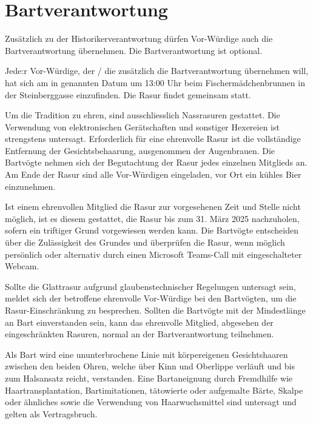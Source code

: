 \documentclass[fontsize=12pt,parskip=half]{scrartcl}
\begin{document}
\section{Bartverantwortung}
\begin{contract}
  \Clause[title={Bartverantwortung}]\label{B.verantwortung}
  Zusätzlich zu der Historikerverantwortung  dürfen Vor-Würdige auch die Bartverantwortung übernehmen. Die Bartverantwortung ist
  optional.

  \Clause[title={Letzte Rasur}]\label{B.lastrasur}
  Jede:r Vor-Würdige, der / die zusätzlich die Bartverantwortung übernehmen will, hat sich am in  genannten Datum um 13:00 Uhr
  beim Fischermädchenbrunnen in der Steinberggasse einzufinden.
  Die Rasur findet gemeinsam statt.

  \SubClause[title={Durchführung der Rasur}]\label{B.durchfuehrung}
  Um die Tradition zu ehren, sind ausschliesslich Nassrasuren gestattet. Die Verwendung von
  elektronischen Gerätschaften und sonstiger Hexereien ist strengstens untersagt. Erforderlich für eine
  ehrenvolle Rasur ist die vollständige Entfernung der Gesichtsbehaarung, ausgenommen der
  Augenbrauen. Die Bartvögte nehmen sich der Begutachtung der Rasur jedes einzelnen Mitglieds
  an.
  \SubClause[title={Anschliessende Kehlenbefeuchtung}]
  Am Ende der Rasur sind alle Vor-Würdigen eingeladen, vor Ort ein kühles Bier einzunehmen.

  \SubClause[title={Rasurverzug}]
  Ist einem ehrenvollen Mitglied die Rasur zur vorgesehenen Zeit und Stelle nicht möglich,
  ist es diesem gestattet, die Rasur bis zum 31. März 2025 nachzuholen, sofern ein triftiger
  Grund vorgewiesen werden kann. Die Bartvögte entscheiden über die Zulässigkeit des Grundes
  und überprüfen die Rasur, wenn möglich persönlich oder alternativ durch einen
  Microsoft Teams-Call mit eingeschalteter Webcam.

  \SubClause[title={Glaubensklausel (Shamess Klausel)}]
  Sollte die Glattrasur aufgrund glaubenstechnischer Regelungen untersagt sein, meldet sich
  der betroffene ehrenvolle Vor-Würdige bei den Bartvögten, um die Rasur-Einschränkung zu
  besprechen. Sollten die Bartvögte mit der Mindestlänge an Bart einverstanden sein,
  kann das ehrenvolle Mitglied, abgesehen der eingeschränkten Rasuren, normal
  an der Bartverantwortung teilnehmen.

  \Clause[title={Bartvorschriften}]
  \SubClause[title={Definition Bart}]
  Als Bart wird eine ununterbrochene Linie mit körpereigenen Gesichtshaaren zwischen den beiden Ohren,
  welche über Kinn und Oberlippe verläuft und bis zum Halsansatz reicht, verstanden. Eine Bartaneignung
  durch Fremdhilfe wie Haartransplantation, Bartimitationen, tätowierte oder aufgemalte Bärte,
  Skalpe oder ähnliches sowie die Verwendung von Haarwuchsmittel sind untersagt und gelten als Vertragsbruch.


\end{contract}
\end{document}
